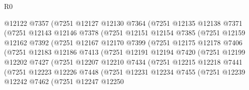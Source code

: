 \begin{lexlean}{R0}
\begin{coremodule}
                  @12122
                  @7357
                  (@7251
                    @12127
                    @12130
                    @7364
                    (@7251
                      @12135
                      @12138
                      @7371
                      (@7251
                        @12143
                        @12146
                        @7378
                        (@7251
                          @12151
                          @12154
                          @7385
                          (@7251
                            @12159
                            @12162
                            @7392
                            (@7251
                              @12167
                              @12170
                              @7399
                              (@7251
                                @12175
                                @12178
                                @7406
                                (@7251
                                  @12183
                                  @12186
                                  @7413
                                  (@7251
                                    @12191
                                    @12194
                                    @7420
                                    (@7251
                                      @12199
                                      @12202
                                      @7427
                                      (@7251
                                        @12207
                                        @12210
                                        @7434
                                        (@7251
                                          @12215
                                          @12218
                                          @7441
                                          (@7251
                                            @12223
                                            @12226
                                            @7448
                                            (@7251
                                              @12231
                                              @12234
                                              @7455
                                              (@7251
                                                @12239
                                                @12242
                                                @7462
                                                (@7251
                                                  @12247
                                                  @12250

\end{coremodule}
\end{lexlean}
